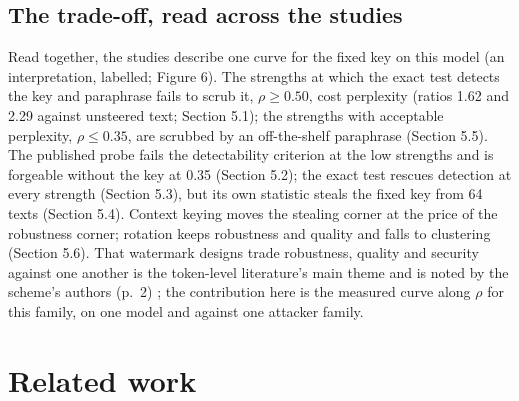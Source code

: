 \documentclass[11pt,letterpaper]{article}
\begin{document}
\hypertarget{the-trade-off-read-across-the-studies}{%
\subsection{The trade-off, read across the studies}\label{the-trade-off-read-across-the-studies}}

Read together, the studies describe one curve for the fixed key on this model (an interpretation, labelled; Figure 6). The strengths at which the exact test detects the key and paraphrase fails to scrub it, \(\rho \geq 0.50\), cost perplexity (ratios 1.62 and 2.29 against unsteered text; Section 5.1); the strengths with acceptable perplexity, \(\rho \leq 0.35\), are scrubbed by an off-the-shelf paraphrase (Section 5.5). The published probe fails the detectability criterion at the low strengths and is forgeable without the key at 0.35 (Section 5.2); the exact test rescues detection at every strength (Section 5.3), but its own statistic steals the fixed key from 64 texts (Section 5.4). Context keying moves the stealing corner at the price of the robustness corner; rotation keeps robustness and quality and falls to clustering (Section 5.6). That watermark designs trade robustness, quality and security against one another is the token-level literature's main theme \citep{pang2024nofreelunch, shen2025seek, jovanovic2024stealing} and is noted by the scheme's authors (p.~2) \citep{ardoin2026selfrecognition}; the contribution here is the measured curve along \(\rho\) for this family, on one model and against one attacker family.

\hypertarget{related-work}{%
\section{Related work}\label{related-work}}
\end{document}
